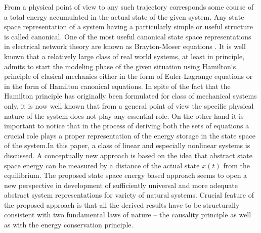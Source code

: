 From a physical point of view to any such trajectory corresponds some course of a total energy accumulated in the actual state of the given system. Any state space representation of a system having a particularly simple or useful structure is called canonical. One of the most useful canonical state space representations in electrical network theory are known as Brayton-Moser equations \cite{stork-hrusak-mayer}. It is well known that a relatively large class of real world systems, at least in principle, admits to start the modeling phase of the given situation using Hamilton`s principle of clasical mechanics either in the form of Euler-Lagrange equations or in the form of Hamilton canonical equations. In spite of the fact that the Hamilton principle has originally been formulated for class of mechanical systems only, it is now well known that from a general point of view the specific physical nature of the system does not play any essential role. On the other hand it is important to notice that in the process of deriving both the sets of equations a crucial role plays a proper representation of the energy storage in the state space of the system.In this paper, a class of linear and especially nonlinear systems is discussed. A conceptually new approach is based on the idea that abstract state space energy can be measured by a distance of the actual state $x(t)$ from the equilibrium. The proposed state space energy based approach seems to open a new perspective in development of sufficiently universal and more adequate abstract system representations for variety of natural systems. Crucial feature of the proposed approach is that all the derived results have to be structurally consistent with two fundamental laws of nature -- the causality principle as well as with the energy conservation principle.
